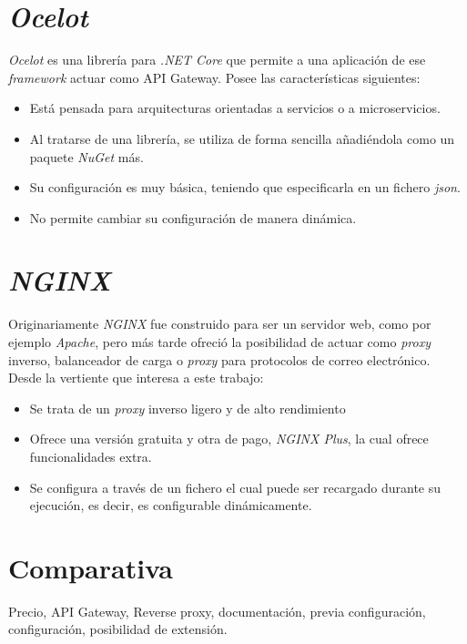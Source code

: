 \documentclass[11pt,spanish,listoffigures]{tfgetsinf}
\begin{document}
\section{\emph{Ocelot}}
\emph{Ocelot} \cite{Ocelot} es una librería para \emph{.NET Core} que permite a una aplicación de ese \emph{framework} actuar como API Gateway. Posee las características siguientes:

\begin{itemize}

\item Está pensada para arquitecturas orientadas a servicios o a microservicios.
\item Al tratarse de una librería, se utiliza de forma sencilla añadiéndola como un paquete \emph{NuGet} más.
\item Su configuración es muy básica, teniendo que especificarla en un fichero \emph{json}.
\item No permite cambiar su configuración de manera dinámica.

\end{itemize}

\section{\emph{NGINX}}
Originariamente \emph{NGINX} \cite{NGINX} fue construido para ser un servidor web, como por ejemplo \emph{Apache}, pero más tarde ofreció la posibilidad de actuar como \emph{proxy} inverso, balanceador de carga o \emph{proxy} para protocolos de correo electrónico. Desde la vertiente que interesa a este trabajo:

\begin{itemize}

\item Se trata de un \emph{proxy} inverso ligero y de alto rendimiento
\item Ofrece una versión gratuita y otra de pago, \emph{NGINX Plus}, la cual ofrece funcionalidades extra.
\item Se configura a través de un fichero el cual puede ser recargado durante su ejecución, es decir, es configurable dinámicamente.

\end{itemize}

\section{Comparativa}

Precio, API Gateway, Reverse proxy, documentación, previa configuración, configuración, posibilidad de extensión.
\end{document}
